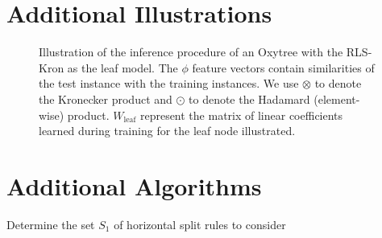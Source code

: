 \pagebreak
\begin{appendices}

\renewcommand\thefigure{\thesection\arabic{figure}}
\renewcommand\thetable{\thesection\arabic{table}}

\renewcommand\thetheorem{\thesection\arabic{theorem}}

\section{Additional Illustrations}
\label{sec:additional illustrations}
\FloatBarrier

%    

\begin{figure}[tbhp]
    \centering
    \def\svgscale{.3}
    
    \caption{Illustration of the inference procedure of an Oxytree with the RLS-Kron as the leaf model. The $\phi$ feature vectors contain similarities of the test instance with the training instances. We use $\otimes$ to denote the Kronecker product and $\odot$ to denote the Hadamard (element-wise) product. $W_\text{leaf}$ represent the matrix of linear coefficients learned during training for the leaf node illustrated.}
    \label{fig:oxytrees prediction}
\end{figure}


\FloatBarrier

\section{Additional Algorithms}
\label{sec:additional algorithms}
\FloatBarrier

\begin{function}[tb]
    \caption{FindBestSplitOxytree($X_1$, $X_2$, $Y$): The split search procedure of Oxytrees.}
    \label{alg:find best split bgso}
    
    \BlankLine
    Determine the set $S_1$ of horizontal split rules to consider\;
    

\end{function}
\end{appendices}
